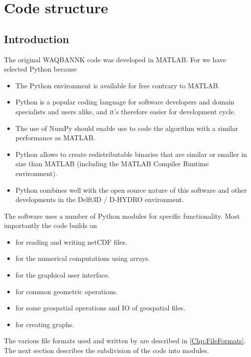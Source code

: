 \chapter{Code structure}

\section{Introduction}

The original WAQBANNK code was developed in MATLAB.
For \dfastbe we have selected Python because

\begin{itemize}
\item The Python environment is available for free contrary to MATLAB.
\item Python is a popular coding language for software developers and domain specialists and users alike, and it's therefore easier for development cycle.
\item The use of NumPy should enable use to code the algorithm with a similar performance as MATLAB.
\item Python allows to create redistributable binaries that are similar or smaller in size than MATLAB (including the MATLAB Compiler Runtime environment).
\item Python combines well with the open source nature of this software and other developments in the Delft3D / D-HYDRO environment.
\end{itemize}

The software uses a number of Python modules for specific functionality.
Most importantly the code builds on

\begin{itemize}
\item {} for reading and writing netCDF files.
\item {} for the numerical computations using arrays.
\item {} for the graphical user interface.
\item {} for common geometric operations.
\item {} for some geospatial operations and IO of geospatial files.
\item {} for creating graphs.
\end{itemize}

The various file formats used and written by \dfastbe are described in \autoref{Chp:FileFormats}.
The next section describes the subdivision of the code into modules.


